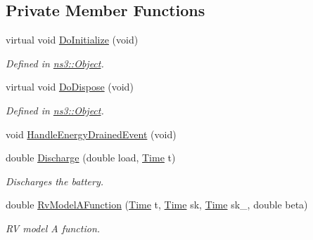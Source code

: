 \subsection*{Private Member Functions}
\begin{DoxyCompactItemize}
\item 
virtual void \hyperlink{classns3_1_1RvBatteryModel_a2876516a9e3fa5e077cc0ee0748dbfe5}{Do\+Initialize} (void)
\begin{DoxyCompactList}\small\item\em Defined in \hyperlink{classns3_1_1Object}{ns3\+::\+Object}. \end{DoxyCompactList}\item 
virtual void \hyperlink{classns3_1_1RvBatteryModel_a9e659d4a7f9472fa53ccfbc0ef6a8c63}{Do\+Dispose} (void)
\begin{DoxyCompactList}\small\item\em Defined in \hyperlink{classns3_1_1Object}{ns3\+::\+Object}. \end{DoxyCompactList}\item 
void \hyperlink{classns3_1_1RvBatteryModel_ac381990282a8d4a984e5b4322c79f89a}{Handle\+Energy\+Drained\+Event} (void)
\item 
double \hyperlink{classns3_1_1RvBatteryModel_a5e485e8966bad557ccb11f6a459e2a8d}{Discharge} (double load, \hyperlink{classns3_1_1Time}{Time} t)
\begin{DoxyCompactList}\small\item\em Discharges the battery. \end{DoxyCompactList}\item 
double \hyperlink{classns3_1_1RvBatteryModel_ab3bf9607642772fb56445a23e654626b}{Rv\+Model\+A\+Function} (\hyperlink{classns3_1_1Time}{Time} t, \hyperlink{classns3_1_1Time}{Time} sk, \hyperlink{classns3_1_1Time}{Time} sk\+\_, double beta)
\begin{DoxyCompactList}\small\item\em RV model A function. \end{DoxyCompactList}\end{DoxyCompactItemize}

